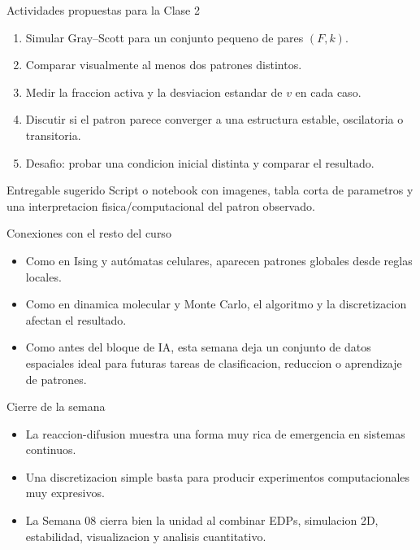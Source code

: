 \begin{frame}{Actividades propuestas para la Clase 2}
\begin{enumerate}
    \item Simular Gray--Scott para un conjunto pequeno de pares $(F,k)$.
    \item Comparar visualmente al menos dos patrones distintos.
    \item Medir la fraccion activa y la desviacion estandar de $v$ en cada caso.
    \item Discutir si el patron parece converger a una estructura estable, oscilatoria o transitoria.
    \item Desafio: probar una condicion inicial distinta y comparar el resultado.
\end{enumerate}

\begin{block}{Entregable sugerido}
Script o notebook con imagenes, tabla corta de parametros y una interpretacion fisica/computacional del patron observado.
\end{block}
\end{frame}

\begin{frame}{Conexiones con el resto del curso}
\begin{itemize}
    \item Como en Ising y autómatas celulares, aparecen patrones globales desde reglas locales.
    \item Como en dinamica molecular y Monte Carlo, el algoritmo y la discretizacion afectan el resultado.
    \item Como antes del bloque de IA, esta semana deja un conjunto de datos espaciales ideal para futuras tareas de clasificacion, reduccion o aprendizaje de patrones.
\end{itemize}
\end{frame}

\begin{frame}{Cierre de la semana}
\begin{itemize}
    \item La reaccion-difusion muestra una forma muy rica de emergencia en sistemas continuos.
    \item Una discretizacion simple basta para producir experimentos computacionales muy expresivos.
    \item La Semana 08 cierra bien la unidad al combinar EDPs, simulacion 2D, estabilidad, visualizacion y analisis cuantitativo.
\end{itemize}
\end{frame}


